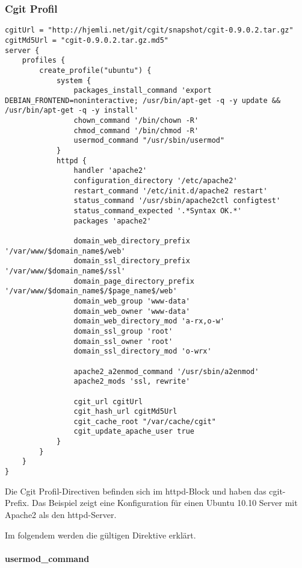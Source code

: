 \subsubsection{Cgit Profil}

\begin{lstlisting}[style=Java, caption=Beispiel Cgit Profil]
cgitUrl = "http://hjemli.net/git/cgit/snapshot/cgit-0.9.0.2.tar.gz"
cgitMd5Url = "cgit-0.9.0.2.tar.gz.md5"
server {
    profiles {
        create_profile("ubuntu") {
            system {
                packages_install_command 'export DEBIAN_FRONTEND=noninteractive; /usr/bin/apt-get -q -y update && /usr/bin/apt-get -q -y install'
                chown_command '/bin/chown -R'
                chmod_command '/bin/chmod -R'
                usermod_command "/usr/sbin/usermod"
            }
            httpd {
                handler 'apache2'
                configuration_directory '/etc/apache2'
                restart_command '/etc/init.d/apache2 restart'
                status_command '/usr/sbin/apache2ctl configtest'
                status_command_expected '.*Syntax OK.*'
                packages 'apache2'

                domain_web_directory_prefix '/var/www/$domain_name$/web'
                domain_ssl_directory_prefix '/var/www/$domain_name$/ssl'
                domain_page_directory_prefix '/var/www/$domain_name$/$page_name$/web'
                domain_web_group 'www-data'
                domain_web_owner 'www-data'
                domain_web_directory_mod 'a-rx,o-w'
                domain_ssl_group 'root'
                domain_ssl_owner 'root'
                domain_ssl_directory_mod 'o-wrx'

                apache2_a2enmod_command '/usr/sbin/a2enmod'
                apache2_mods 'ssl, rewrite'

                cgit_url cgitUrl
                cgit_hash_url cgitMd5Url
                cgit_cache_root "/var/cache/cgit"
                cgit_update_apache_user true
            }
        }
    }
}
\end{lstlisting}

Die Cgit Profil-Directiven befinden sich im httpd-Block und haben das cgit-Prefix. Das Beispiel zeigt eine Konfiguration für einen Ubuntu 10.10 Server mit Apache2 als den httpd-Server.

Im folgendem werden die gültigen Direktive erklärt.

\paragraph{usermod\_command}

